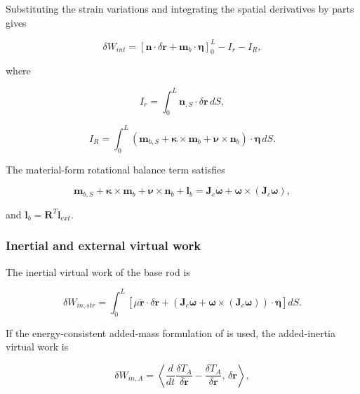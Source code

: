 Substituting the strain variations and integrating the spatial derivatives by parts gives

\begin{equation}
\label{eq:rod-1-81}
\delta W_{int} = \left\lbrack \mathbf{n} \cdot \delta\mathbf{r} + \mathbf{m}_{b} \cdot \bm{\eta} \right\rbrack_{0}^{L} - I_{r} - I_{R},
\end{equation}

where

\begin{equation}
\label{eq:rod-1-82}
I_{r} = \int_{0}^{L}\mathbf{n}_{,S} \cdot \delta\mathbf{r}\, dS,
\end{equation}

\begin{equation}
\label{eq:rod-1-83}
I_{R} = \int_{0}^{L}\left( \mathbf{m}_{b,S} + \bm{\kappa} \times \mathbf{m}_{b} + \bm{\nu} \times \mathbf{n}_{b} \right) \cdot \bm{\eta}\, dS.
\end{equation}

The material-form rotational balance term satisfies

\begin{equation}
\label{eq:rod-1-84}
\mathbf{m}_{b,S} + \bm{\kappa} \times \mathbf{m}_{b} + \bm{\nu} \times \mathbf{n}_{b} + \mathbf{l}_{b} = \mathbf{J}_{c}\dot{\bm{\omega}} + \bm{\omega} \times \left( \mathbf{J}_{c}\bm{\omega} \right),
\end{equation}

and \(\mathbf{l}_{b} = \mathbf{R}^{T}\mathbf{l}_{ext}\).

\subsubsection{Inertial and external virtual work}\label{sec:rod-1-5-3}

The inertial virtual work of the base rod is

\begin{equation}
\label{eq:rod-1-85}
\delta W_{in,str} = \int_{0}^{L}\left\lbrack \mu\ddot{\mathbf{r}} \cdot \delta\mathbf{r} + \left( \mathbf{J}_{c}\dot{\bm{\omega}} + \bm{\omega} \times \left( \mathbf{J}_{c}\bm{\omega} \right) \right) \cdot \bm{\eta} \right\rbrack dS.
\end{equation}

If the energy-consistent added-mass formulation of  is used, the added-inertia virtual work is

\begin{equation}
\label{eq:rod-1-86}
\delta W_{in,A} = \left\langle \frac{d}{dt}\frac{\delta T_{A}}{\delta\dot{\mathbf{r}}} - \frac{\delta T_{A}}{\delta\mathbf{r}},\,\delta\mathbf{r} \right\rangle,
\end{equation}

